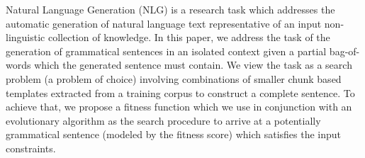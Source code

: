 Natural Language Generation (NLG) is a research task which addresses the automatic generation of natural language text representative of an input non-linguistic collection of knowledge. In this paper, we address the task of the generation of grammatical sentences in an isolated context given a partial bag-of-words which the generated sentence must contain. We view the task as a search problem (a problem of choice) involving combinations of smaller chunk based templates extracted from a training corpus to construct a complete sentence. To achieve that, we propose a fitness function which we use in conjunction with an evolutionary algorithm as the search procedure to arrive at a potentially grammatical sentence (modeled by the fitness score) which satisfies the input constraints.
